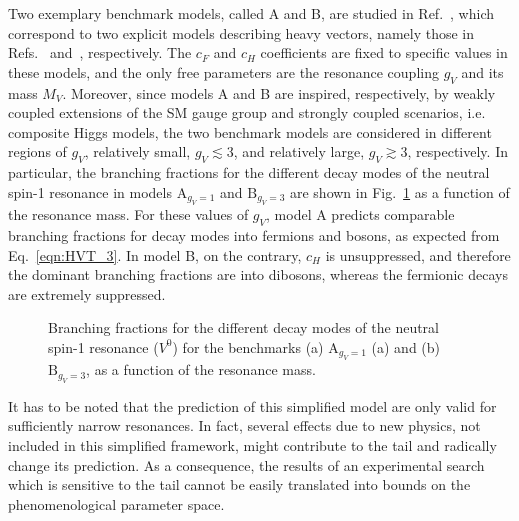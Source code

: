 Two exemplary benchmark models, called A and B, are studied in Ref.~\cite{Pappadopulo:2014qza}, which correspond to two explicit models describing heavy vectors, namely those in Refs.~\cite{PhysRevD.22.727} and~\cite{Composite1}, respectively. The $c_F$ and $c_H$ coefficients are fixed to specific values in these models, and the only free parameters are the resonance coupling $g_V$ and its mass $M_V$.
Moreover, since models A and B are inspired, respectively, by weakly coupled extensions of the SM gauge group and strongly coupled scenarios, i.e. composite Higgs models, the two benchmark models are considered in different regions of $g_V$, relatively small, $g_V \lesssim 3$, and relatively large, $g_V \gtrsim 3$, respectively. In particular, the branching fractions for the different decay modes of the neutral spin-1 resonance in models $\mathrm{A}_{g_V=1}$ and $\mathrm{B}_{g_V=3}$ are shown in Fig.~\ref{fig:hvtBR} as a function of the resonance mass. For these values of $g_V$, model A predicts comparable branching fractions for decay modes into fermions and bosons, as expected from Eq.~\ref{eqn:HVT_3}. In model B, on the contrary, $c_H$ is unsuppressed, and therefore the dominant branching fractions are into dibosons, whereas the fermionic decays are extremely suppressed.

\begin{figure}[!htb]
\centering
{}
\caption{Branching fractions for the different decay modes of the neutral spin-1 resonance \Zpr ($V^0$) for the benchmarks (a) $\mathrm{A}_{g_V=1}$ (a) and (b) $\mathrm{B}_{g_V=3}$, as a function of the resonance mass.}
\label{fig:hvtBR}
\end{figure}

It has to be noted that the prediction of this simplified model are only valid for sufficiently narrow resonances.
In fact, several effects due to new physics, not included in this simplified framework, might contribute to the tail and radically change its prediction.
As a consequence, the results of an experimental search which is sensitive to the tail cannot be easily translated into bounds on the phenomenological parameter space.